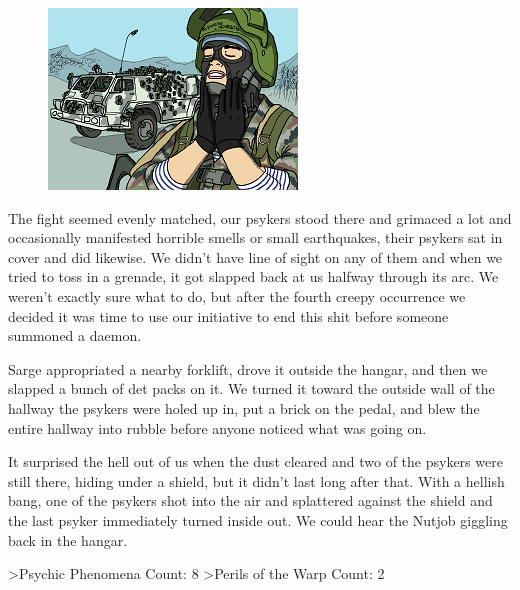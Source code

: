 \begin{figure}
\begin{center}
	\includegraphics[width=\figwidth]{pics/3/16.png}
\end{center}
\end{figure}
The fight seemed evenly matched, our psykers stood there and grimaced a lot and occasionally manifested horrible smells or small earthquakes, their psykers sat in cover and did likewise. 
We didn’t have line of sight on any of them and when we tried to toss in a grenade, it got slapped back at us halfway through its arc. 
We weren’t exactly sure what to do, but after the fourth creepy occurrence we decided it was time to use our initiative to end this shit before someone summoned a daemon.

Sarge appropriated a nearby forklift, drove it outside the hangar, and then we slapped a bunch of det packs on it. 
We turned it toward the outside wall of the hallway the psykers were holed up in, put a brick on the pedal, and blew the entire hallway into rubble before anyone noticed what was going on. 

It surprised the hell out of us when the dust cleared and two of the psykers were still there, hiding under a shield, but it didn’t last long after that. 
With a hellish bang, one of the psykers shot into the air and splattered against the shield and the last psyker immediately turned inside out. 
We could hear the Nutjob giggling back in the hangar.

>Psychic Phenomena Count: 8
>Perils of the Warp Count: 2


